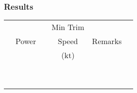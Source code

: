 % 
% 
%
\Large
\subsubsection*{Results}
  \settowidth{\colOne}{(USG)}
  \settowidth{\colTwo}{Power}
  \settowidth{\colThree}{Altitude}
  \settowidth{\colFive}{Remarks}

  \begin{tabularx}{\textwidth}{|c|c|c|c|lX|}
    \hline
\multirow{3}{\colOne}{\centering {Fuel (USG)}}&\multirow{3}{\colTwo}{Power}&\multirow{3}{\colThree}{\centering {Altitude (ft)}}&Min Trim&\multirow{3}{\colFive}{\centering Remarks}&\\
&&&Speed&&\\
&&&(kt)&&\\
    \hline
    \hline
    &&&&&\\
    \hline
    &&&&&\\
    \hline
    &&&&&\\
    \hline
    &&&&&\\
    \hline
    &&&&&\\
    \hline
    &&&&&\\
    \hline
    &&&&&\\
    \hline
    &&&&&\\
    \hline
    &&&&&\\
    \hline
    \end{tabularx}     
    \normalsize

   